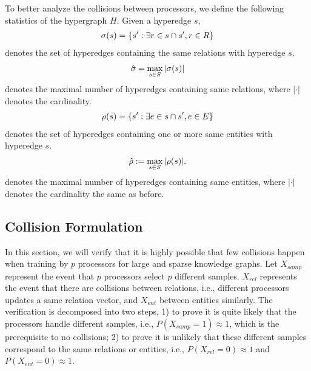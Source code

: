 \documentclass[sigconf]{acmart}
\begin{document}
To better analyze the collisions between processors, we define the following statistics of the hypergraph  $H$. Given a hyperedge $s$,
\begin{align}
\vspace{-7pt}
\label{eqdeltae}
\sigma(s) = \{s': \exists r \in s \cap s', r \in R \}
\vspace{-7pt}
\end{align}
denotes the set of hyperedges containing the same relations with hyperedge $s$. 
\begin{align}
\vspace{-7pt}
\label{eqdeltaemax}
\hat{\sigma} = \max_{s \in S}|\sigma(s)|
\vspace{-7pt}
\end{align}
denotes the maximal number of  hyperedges containing same relations, where $|\cdot|$ denotes the cardinality.
\begin{align}
\label{eqdeltar}
\vspace{-7pt}
\rho (s) =  \{s': \exists e \in s \cap s', e \in E \} 
\vspace{-7pt}
\end{align}
denotes the set of hyperedges containing one or more same entities with hyperedge $s$. 
\begin{align}
\vspace{-7pt}
\label{eqdeltarmax}
\hat{\rho} := \max_{s \in S}|\rho(s)|.
\vspace{-7pt}
\end{align}
denotes the maximal number of  hyperedges containing same entities, where $|\cdot|$ denotes the cardinality the same as before.



\subsection{Collision Formulation}






In this section, we will verify that it is highly possible that few collisions happen when training by $p$ processors for large and sparse knowledge graphs. 
Let $X_{samp}$ represent the event that $p$ processors select $p$ different samples.
$X_{rel}$ represents the event that there are collisions between relations, i.e., different processors updates a same relation vector, and $X_{ent}$ between entities similarly.
The verification is decomposed into two steps, 1) to prove it is quite likely that the processors handle different samples, i.e., $P(X_{samp}=1) \approx 1$, which is the prerequisite to no collisions; 2) to prove it is unlikely that these different samples correspond to the same relations or entities, i.e., $P(X_{rel}=0) \approx 1$ and  $P(X_{ent}=0) \approx 1$.
\end{document}
